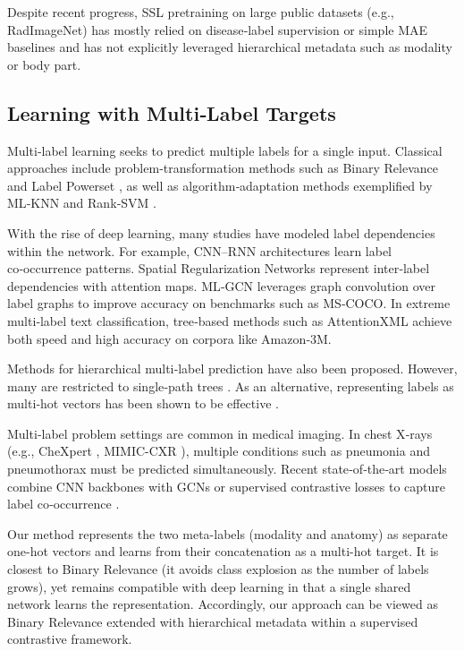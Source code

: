 \documentclass[final,1p,times]{elsarticle}
\begin{document}
Despite recent progress, SSL pretraining on large public datasets (e.g., RadImageNet) has mostly relied on disease‑label supervision \cite{mei_radimagenet_2022} or simple MAE baselines \cite{liu2024vis} and has not explicitly leveraged hierarchical metadata such as modality or body part.

\subsection{Learning with Multi‑Label Targets}
Multi‑label learning seeks to predict multiple labels for a single input.
Classical approaches include problem‑transformation methods such as Binary Relevance \cite{tsoumakas_mining_2010} and Label Powerset \cite{boutell_learning_2004}, as well as algorithm‑adaptation methods exemplified by ML‑KNN \cite{zhang_ml-knn_2007} and Rank‑SVM \cite{elisseeff_kernel_2001}.

With the rise of deep learning, many studies have modeled label dependencies within the network. For example, CNN–RNN architectures \cite{wang_cnn-rnn_2016} learn label co‑occurrence patterns. Spatial Regularization Networks \cite{zhu_learning_2017} represent inter‑label dependencies with attention maps. ML‑GCN \cite{chen_multi-label_2019} leverages graph convolution over label graphs to improve accuracy on benchmarks such as MS‑COCO.
In extreme multi‑label text classification, tree‑based methods such as AttentionXML \cite{you_attentionxml_2019} achieve both speed and high accuracy on corpora like Amazon‑3M.

Methods for hierarchical multi‑label prediction have also been proposed.
However, many are restricted to single‑path trees \cite{zhang_use_2022}\cite{kokilepersaud_hex_2025}.
As an alternative, representing labels as multi‑hot vectors has been shown to be effective \cite{li_hierarchical_2025}.

Multi‑label problem settings are common in medical imaging. In chest X‑rays (e.g., CheXpert \cite{irvin_chexpert_2019}, MIMIC-CXR \cite{johnson_mimic-cxr_2024}), multiple conditions such as pneumonia and pneumothorax must be predicted simultaneously.
Recent state‑of‑the‑art models combine CNN backbones with GCNs or supervised contrastive losses to capture label co‑occurrence \cite{mao_imagegcn_2022}\cite{jaiswal_scalp-supervised_2021}\cite{chen_multi-label_2019}.

Our method represents the two meta-labels (modality and anatomy) as separate one-hot vectors and learns from their concatenation as a multi-hot target.
It is closest to Binary Relevance (it avoids class explosion as the number of labels grows), yet remains compatible with deep learning in that a single shared network learns the representation. Accordingly, our approach can be viewed as Binary Relevance extended with hierarchical metadata within a supervised contrastive framework.
\end{document}
